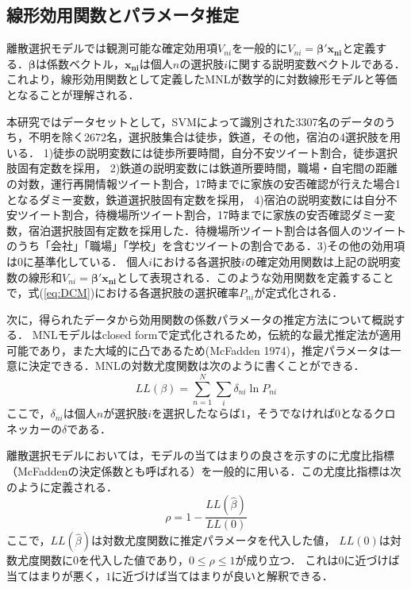 \documentclass[japanese]{jnlp_1.4}
\begin{document}
\subsection{線形効用関数とパラメータ推定}

離散選択モデルでは観測可能な確定効用項$V_{ni}$を一般的に$V_{ni} = \boldsymbol{\beta}' \boldsymbol{x_{ni}}$と定義する．$\boldsymbol{\beta}$は係数ベクトル，$\boldsymbol{x_{ni}}$は個人$n$の選択肢$i$に関する説明変数ベクトルである．これより，線形効用関数として定義したMNLが数学的に対数線形モデルと等価となることが理解される．

本研究ではデータセットとして，SVMによって識別された3307名のデータのうち，不明を除く2672名，選択肢集合は徒歩，鉄道，その他，宿泊の4選択肢を用いる．
1)徒歩の説明変数には徒歩所要時間，自分不安ツイート割合，徒歩選択肢固有定数を採用，
2)鉄道の説明変数には鉄道所要時間，職場・自宅間の距離の対数，運行再開情報ツイート割合，17時までに家族の安否確認が行えた場合1となるダミー変数，鉄道選択肢固有定数を採用，
4)宿泊の説明変数には自分不安ツイート割合，待機場所ツイート割合，17時までに家族の安否確認ダミー変数，宿泊選択肢固有定数を採用した．待機場所ツイート割合は各個人のツイートのうち「会社」「職場」「学校」を含むツイートの割合である．3)その他の効用項は0に基準化している．
個人$i$における各選択肢$i$の確定効用関数は上記の説明変数の線形和$V_{ni} = \boldsymbol{\beta}' \boldsymbol{x_{ni}}$として表現される．このような効用関数を定義することで，式(\ref{eq:DCM})における各選択肢の選択確率$P_{ni}$が定式化される．

次に，得られたデータから効用関数の係数パラメータの推定方法について概説する．
MNLモデルはclosed formで定式化されるため，伝統的な最尤推定法が適用可能であり，また大域的に凸であるため(McFadden 1974)，推定パラメータは一意に決定できる．MNLの対数尤度関数は次のように書くことができる．
\begin{equation}
LL ( \beta) = \sum_{n=1}^{N} \sum_{i} \delta_{ni} \ln P_{ni}
\end{equation}
ここで，$\delta_{ni}$は個人$n$が選択肢$i$を選択したならば$1$，そうでなければ$0$となるクロネッカーの$\delta$である．

離散選択モデルにおいては，モデルの当てはまりの良さを示すのに尤度比指標（McFaddenの決定係数とも呼ばれる）を一般的に用いる．この尤度比指標は次のように定義される．
\begin{equation}
\rho = 1 - \frac{LL(\hat \beta)}{LL(0)}
\end{equation}
ここで，$LL(\hat \beta)$は対数尤度関数に推定パラメータを代入した値，
$LL(0)$は対数尤度関数に$0$を代入した値であり，$0 \leq \rho \leq 1$が成り立つ．
これは0に近づけば当てはまりが悪く，$1$に近づけば当てはまりが良いと解釈できる．
\end{document}

